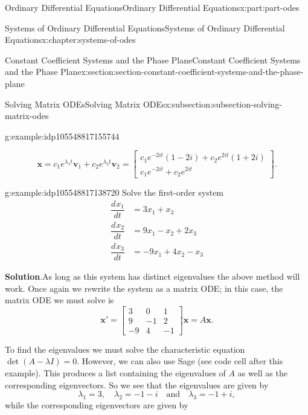 \documentclass[twoside,10pt,]{book}
\newcommand{\blocktitlefont}{\relax}
\numberwithin{equation}{part}
\renewcommand{\vec}[1]{\mathbf{#1}}
\providecommand{\dv}[3][]{\dfrac{d^{#1} #2}{d #3^{#1}}}
\newcommand{\amp}{&}
\begin{document}
\begin{partptx}{Ordinary Differential Equations}{}{Ordinary Differential Equations}{}{}{x:part:part-odes}
\begin{chapterptx}{Systems of Ordinary Differential Equations}{}{Systems of Ordinary Differential Equations}{}{}{x:chapter:systems-of-odes}
\begin{sectionptx}{Constant Coefficient Systems and the Phase Plane}{}{Constant Coefficient Systems and the Phase Plane}{}{}{x:section:section-constant-coefficient-systems-and-the-phase-plane}
\begin{subsectionptx}{Solving Matrix ODEs}{}{Solving Matrix ODEs}{}{}{x:subsection:subsection-solving-matrix-odes}
\begin{example}{}{g:example:idp105548817155744}
\begin{enumerate}
\begin{equation*}
\vec{x} = c_{1}e^{\lambda_{1}t}\vec{v}_{1} + c_{2}e^{\lambda_{2}t}\vec{v}_{2} = \begin{bmatrix}c_{1}e^{-2it}(1-2i)+c_{2}e^{2it}(1+2i) \\ c_{1}e^{-2it}+c_{2}e^{2it}\end{bmatrix}.
\end{equation*}
%
\end{enumerate}
%
\end{example}
\begin{example}{}{g:example:idp105548817138720}%
Solve the first-order system%
\begin{align*}
\dv{x_{1}}{t} \amp = 3x_{1}+x_{3}\\
\dv{x_{2}}{t} \amp = 9x_{1}-x_{2}+2x_{3}\\
\dv{x_{3}}{t} \amp = -9x_{1} + 4x_{2} - x_{3}
\end{align*}
%
\par\smallskip%
\noindent\textbf{\blocktitlefont Solution}.\hypertarget{g:solution:idp105548817140384}{}\quad{}As long as this system has distinct eigenvalues the above method will work. Once again we rewrite the system as a matrix ODE; in this case, the matrix ODE we must solve is%
\begin{equation*}
\vec{x}' = \begin{bmatrix}3 \amp  0 \amp  1 \\ 9 \amp  -1 \amp  2 \\ -9 \amp  4 \amp  -1\end{bmatrix}\vec{x} = A\vec{x}.
\end{equation*}
%
\par
To find the eigenvalues we must solve the characteristic equation \(\det(A-\lambda I)=0\). However, we can also use Sage (see code cell after this example). This produces a list containing the eigenvalues of \(A\) as well as the corresponding eigenvectors. So we see that the eigenvalues are given by%
\begin{equation*}
\lambda_{1} = 3, \quad\lambda_{2} = -1 - i\quad\text{and}\quad\lambda_{3} = -1 + i,
\end{equation*}
while the corresponding eigenvectors are given by%
\begin{equation*}

\end{equation*}
\end{example}
\end{subsectionptx}
\end{sectionptx}
\end{chapterptx}
\end{partptx}
\end{document}
